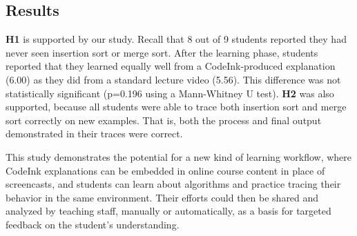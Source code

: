 
\subsection{Results}
\textbf{H1} is supported by our study. Recall that 8 out of 9 students reported
they had never seen insertion sort or merge sort. After the learning phase,
students reported that they learned equally well from a CodeInk-produced
explanation (6.00) as they did from a standard lecture video (5.56). This
difference was not statistically significant (p=0.196 using a Mann-Whitney U
test). \textbf{H2} was also supported, because all students were able to trace
both insertion sort and merge sort correctly on new examples. That is, both the
process and final output demonstrated in their traces were correct.


This study demonstrates the potential for a new kind of learning workflow, where
CodeInk explanations can be embedded in online course content in place of
screencasts, and students can learn about algorithms and practice tracing their
behavior in the same environment. Their efforts could then be shared and
analyzed by teaching staff, manually or automatically, as a basis for targeted
feedback on the student's understanding.

